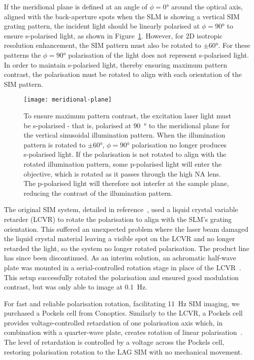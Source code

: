 If the meridional plane is defined at an angle of $\phi=0\si{\degree}$ around the optical axis, aligned with the back-aperture spots when the SLM is showing a vertical SIM grating pattern, the incident light should be linearly polarised at $\phi=90\si{\degree}$ to ensure s-polarised light, as shown in Figure~\ref{fig:meridional-plane}. 
However, for 2D isotropic resolution enhancement, the SIM pattern must also be rotated to $\pm60\si{\degree}$. 
For these patterns the $\phi=90\si{\degree}$ polarisation of the light does not represent s-polarised light. 
In order to maintain s-polarised light, thereby ensuring maximum pattern contrast, the polarisation must be rotated to align with each orientation of the SIM pattern. 

\begin{figure}[tbp]
\centering
\texttt{[image: meridional-plane]}
\caption[LAG SIM: Laser polarisation must be perpendicular to the sinusoidal illumination for high pattern contrast]{To ensure maximum pattern contrast, the excitation laser light must be s-polarised - that is, polarised at \SI{90}{\degree} to the meridional plane for the vertical sinusoidal illumination pattern. When the illumination pattern is rotated to $\pm60\si{\degree}$, $\phi=90\si{\degree}$ polarisation no longer produces s-polarised light. If the polarisation is not rotated to align with the rotated illumination pattern, some p-polarised light will enter the objective, which is rotated as it passes through the high NA lens. The p-polarised light will therefore not interfer at the sample plane, reducing the contrast of the illumination pattern.} \label{fig:meridional-plane}
\end{figure}

The original SIM system, detailed in reference~\cite{young2016guide}, used a liquid crystal variable retarder (LCVR) to rotate the polarisation to align with the SLM's grating orientation. 
This suffered an unexpected problem where the laser beam damaged the liquid crystal material leaving a visible spot on the LCVR and no longer retarded the light, so the system no longer rotated polarisation. 
The product line has since been discontinued.
As an interim solution, an achromatic half-wave plate was mounted in a serial-controlled rotation stage in place of the LCVR~\cite[\textit{ch. 8}]{hecht2017optics}. 
This setup successfully rotated the polarisation and ensured good modulation contrast, but was only able to image at \SI{0.1}{\hertz}. 

For fast and reliable polarisation rotation, facilitating \SI{11}{\hertz} SIM imaging, we purchased a Pockels cell from Conoptics. 
Similarly to the LCVR, a Pockels cell provides voltage-controlled retardation of one polarisation axis which, in combination with a quarter-wave plate, creates rotation of linear polarisation~\cite[\textit{ch. 8}]{hecht2017optics}.
The level of retardation is controlled by a voltage across the Pockels cell, restoring polarisation rotation to the LAG SIM with no mechanical movement. 

